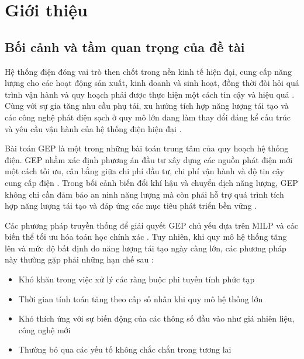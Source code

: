 \chapter{Giới thiệu}

\section{Bối cảnh và tầm quan trọng của đề tài}

Hệ thống điện đóng vai trò then chốt trong nền kinh tế hiện đại, cung cấp năng lượng cho các hoạt động sản xuất, kinh doanh và sinh hoạt, đồng thời đòi hỏi quá trình vận hành và quy hoạch phải được thực hiện một cách tin cậy và hiệu quả \cite{wood2013powersystems,koltsaklis2018gep}. Cùng với sự gia tăng nhu cầu phụ tải, xu hướng tích hợp năng lượng tái tạo và các công nghệ phát điện sạch ở quy mô lớn đang làm thay đổi đáng kể cấu trúc và yêu cầu vận hành của hệ thống điện hiện đại \cite{oree2017gep_review,nrel2024atb}.

Bài toán GEP là một trong những bài toán trung tâm của quy hoạch hệ thống điện. GEP nhằm xác định phương án đầu tư xây dựng các nguồn phát điện mới một cách tối ưu, cân bằng giữa chi phí đầu tư, chi phí vận hành và độ tin cậy cung cấp điện \cite{koltsaklis2018gep,sadeghi2017gep_review}. Trong bối cảnh biến đổi khí hậu và chuyển dịch năng lượng, GEP không chỉ cần đảm bảo an ninh năng lượng mà còn phải hỗ trợ quá trình tích hợp năng lượng tái tạo và đáp ứng các mục tiêu phát triển bền vững \cite{oree2017gep_review}.

Các phương pháp truyền thống để giải quyết GEP chủ yếu dựa trên MILP và các biến thể tối ưu hóa toán học chính xác \cite{koltsaklis2018gep,sadeghi2017gep_review}. Tuy nhiên, khi quy mô hệ thống tăng lên và mức độ bất định do năng lượng tái tạo ngày càng lớn, các phương pháp này thường gặp phải những hạn chế sau \cite{oree2017gep_review}:

\begin{itemize}
    \item Khó khăn trong việc xử lý các ràng buộc phi tuyến tính phức tạp
    \item Thời gian tính toán tăng theo cấp số nhân khi quy mô hệ thống lớn
    \item Khó thích ứng với sự biến động của các thông số đầu vào như giá nhiên liệu, công nghệ mới
    \item Thường bỏ qua các yếu tố không chắc chắn trong tương lai
\end{itemize}


